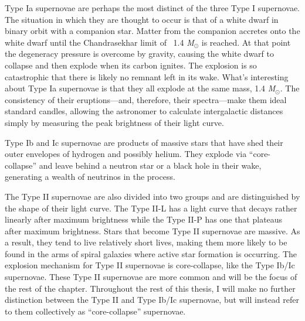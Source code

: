 		Type Ia supernovae are perhaps the most distinct of the three Type I supernovae. The situation in which they are thought to occur is that of a white dwarf in binary orbit with a companion star. Matter from the companion accretes onto the white dwarf until the Chandrasekhar limit of \ 1.4 \emph{M}$_\odot$ is reached. At that point the degeneracy pressure is overcome by gravity, causing the white dwarf to collapse and then explode when its carbon ignites. The explosion is so catastrophic that there is likely no remnant left in its wake. What's interesting about Type Ia supernovae is that they all explode at the same mass, 1.4 \emph{M}$_\odot$. The consistency of their eruptions---and, therefore, their spectra---make them ideal standard candles, allowing the astronomer to calculate intergalactic distances simply by measuring the peak brightness of their light curve.

		Type Ib and Ic supernovae are products of massive stars that have shed their outer envelopes of hydrogen and possibly helium. They explode via ``core-collapse'' and leave behind a neutron star or a black hole in their wake, generating a wealth of neutrinos in the process. 

		The Type II supernovae are also divided into two groups and are distinguished by the shape of their light curve. The Type II-L has a light curve that decays rather linearly after maximum brightness while the Type II-P has one that plateaus after maximum brightness. Stars that become Type II supernovae are massive. As a result, they tend to live relatively short lives, making them more likely to be found in the arms of spiral galaxies where active star formation is occurring. The explosion mechanism for Type II supernovae is core-collapse, like the Type Ib/Ic supernovae. 
		These Type II supernovae are more common\cite{sn_rate} and will be the focus of the rest of the chapter. Throughout the rest of this thesis, I will make no further distinction between the Type II and Type Ib/Ic supernovae, but will instead refer to them collectively as ``core-collapse'' supernovae.

